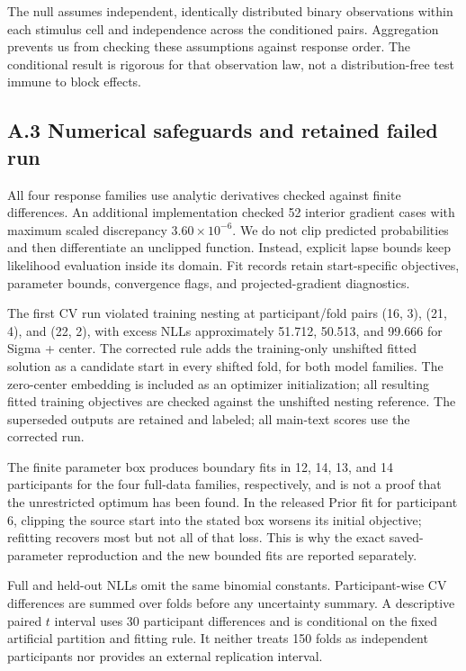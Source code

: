 \documentclass[
  11pt,
]{article}
\let\ctdoldsubsection\subsection
\renewcommand{\subsection}{\Needspace{6\baselineskip}\ctdoldsubsection}
\begin{document}
The null assumes independent, identically distributed binary
observations within each stimulus cell and independence across the
conditioned pairs. Aggregation prevents us from checking these
assumptions against response order. The conditional result is rigorous
for that observation law, not a distribution-free test immune to block
effects.

\hypertarget{a.3-numerical-safeguards-and-retained-failed-run}{%
\subsection{A.3 Numerical safeguards and retained failed
run}\label{a.3-numerical-safeguards-and-retained-failed-run}}

All four response families use analytic derivatives checked against
finite differences. An additional implementation checked 52 interior
gradient cases with maximum scaled discrepancy \(3.60\times10^{-6}\). We
do not clip predicted probabilities and then differentiate an unclipped
function. Instead, explicit lapse bounds keep likelihood evaluation
inside its domain. Fit records retain start-specific objectives,
parameter bounds, convergence flags, and projected-gradient diagnostics.

The first CV run violated training nesting at participant/fold pairs
(16, 3), (21, 4), and (22, 2), with excess NLLs approximately 51.712,
50.513, and 99.666 for Sigma + center. The corrected rule adds the
training-only unshifted fitted solution as a candidate start in every
shifted fold, for both model families. The zero-center embedding is
included as an optimizer initialization; all resulting fitted training
objectives are checked against the unshifted nesting reference. The
superseded outputs are retained and labeled; all main-text scores use
the corrected run.

The finite parameter box produces boundary fits in 12, 14, 13, and 14
participants for the four full-data families, respectively, and is not a
proof that the unrestricted optimum has been found. In the released
Prior fit for participant 6, clipping the source start into the stated
box worsens its initial objective; refitting recovers most but not all
of that loss. This is why the exact saved-parameter reproduction and the
new bounded fits are reported separately.

Full and held-out NLLs omit the same binomial constants.
Participant-wise CV differences are summed over folds before any
uncertainty summary. A descriptive paired \(t\) interval uses 30
participant differences and is conditional on the fixed artificial
partition and fitting rule. It neither treats 150 folds as independent
participants nor provides an external replication interval.
\end{document}
